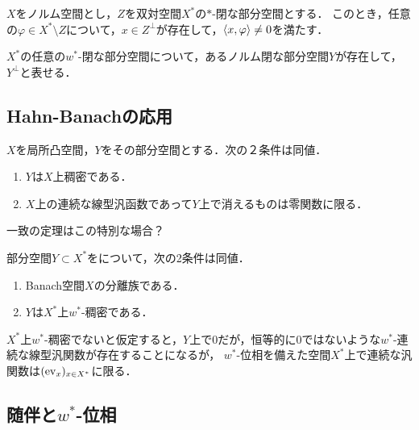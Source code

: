 \documentclass[uplatex,dvipdfmx]{jsreport}
\begin{document}
\begin{proposition}[$w^*$-閉な部分空間の表現]
    $X$をノルム空間とし，$Z$を双対空間$X^*$の$*$-閉な部分空間とする．
    このとき，任意の$\varphi\in X^*\setminus Z$について，$x\in Z^\perp$が存在して，$\langle x,\varphi\rangle\ne 0$を満たす．
\end{proposition}

\begin{corollary}
    $X^*$の任意の$w^*$-閉な部分空間について，あるノルム閉な部分空間$Y$が存在して，$Y^\perp$と表せる．
\end{corollary}

\subsection{Hahn-Banachの応用}

\begin{corollary}
    $X$を局所凸空間，$Y$をその部分空間とする．次の２条件は同値．
    \begin{enumerate}
        \item $Y$は$X$上稠密である．
        \item $X$上の連続な線型汎函数であって$Y$上で消えるものは零関数に限る．
    \end{enumerate}
\end{corollary}
\begin{remarks}
    一致の定理はこの特別な場合？
\end{remarks}

\begin{corollary}[双対空間の稠密部分空間の特徴付け]\label{cor-separating-subspace-is-dense}
    部分空間$Y\subset X^*$をについて，次の2条件は同値．
    \begin{enumerate}
        \item Banach空間$X$の分離族である．
        \item $Y$は$X^*$上$w^*$-稠密である．
    \end{enumerate}
\end{corollary}
\begin{Proof}
    $X^*$上$w^*$-稠密でないと仮定すると，$Y$上で$0$だが，恒等的に$0$ではないような$w^*$-連続な線型汎関数が存在することになるが，
    $w^*$-位相を備えた空間$X^*$上で連続な汎関数は$(\mathrm{ev}_x)_{x\in X^*}$に限る．
\end{Proof}

\subsection{随伴と$w^*$-位相}
\end{document}
